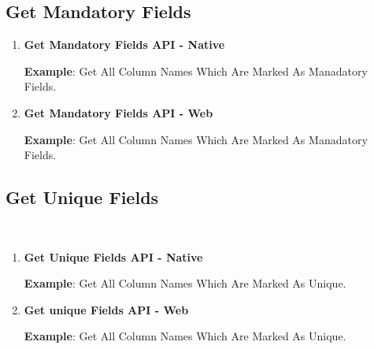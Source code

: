 	\subsection{Get Mandatory Fields}

		\begin{enumerate}

			\item \small \textbf{Get Mandatory Fields API - Native}
				

				\par
				\textbf{Example}: Get All Column Names Which Are Marked As Manadatory Fields.
					
		
			\item \small \textbf{Get Mandatory Fields API - Web}
				

				\par
				\textbf{Example}: Get All Column Names Which Are Marked As Manadatory Fields.
					

		\end{enumerate}


	\subsection{Get Unique Fields}\
		
		\begin{enumerate}

			\item \small \textbf{Get Unique Fields API - Native}
				

				\par
				\textbf{Example}: Get All Column Names Which Are Marked As Unique.
					
	

			\item \small \textbf{Get unique Fields API - Web}
				

				\par
				\textbf{Example}: Get All Column Names Which Are Marked As Unique.
					

		\end{enumerate}




